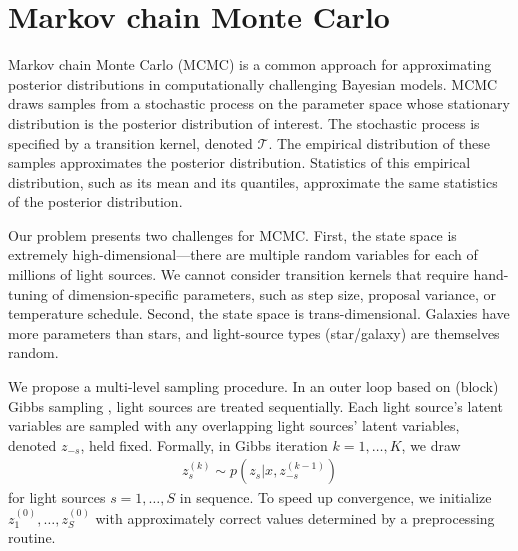 \section{Markov chain Monte Carlo}
\label{sec:mcmc}

Markov chain Monte Carlo (MCMC) is a common approach for approximating posterior distributions in computationally challenging Bayesian models.
MCMC draws samples from a stochastic process on the parameter space whose stationary distribution is the posterior distribution of interest.
The stochastic process is specified by a transition kernel, denoted $\mathcal T$.
The empirical distribution of these samples approximates the posterior distribution.
Statistics of this empirical distribution, such as its mean and its quantiles, approximate the same
statistics of the posterior distribution.

Our problem presents two challenges for MCMC.
First, the state space is extremely high-dimensional---there are multiple random variables for each of millions of light sources.
We cannot consider transition kernels that require hand-tuning of dimension-specific parameters, such as step size, proposal variance, or temperature schedule.
Second, the state space is trans-dimensional. %
Galaxies have more parameters than stars, and light-source types (star/galaxy) are themselves random.

We propose a multi-level sampling procedure.
In an outer loop based on (block) Gibbs sampling \citep{robert2013monte}, %
light sources are treated sequentially. Each light source's latent variables are sampled with any overlapping light sources' latent variables, denoted $z_{-s}$, held fixed.
Formally, in Gibbs iteration $k=1,\ldots,K$, we draw
\begin{align}
z_s^{(k)} \sim p(z_s | x, z_{-s}^{(k-1)}) 
\label{eqzs}
\end{align}
for light sources $s=1,\ldots,S$ in sequence.
To speed up convergence,
we initialize $z_1^{(0)},\ldots,z_S^{(0)}$ with approximately correct values determined by a preprocessing routine.

